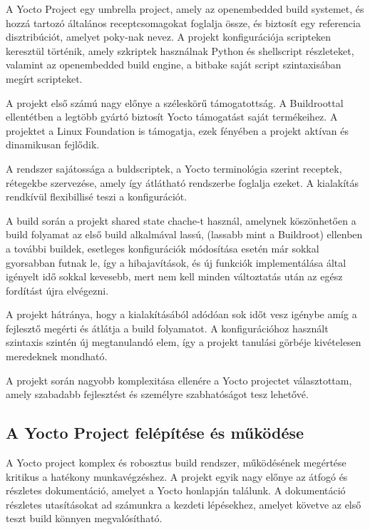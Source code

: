 A Yocto Project egy umbrella project, amely az openembedded build systemet, és
hozzá tartozó általános receptcsomagokat foglalja össze, és biztosít egy
referencia disztribúciót, amelyet poky-nak nevez. A projekt konfigurációja
scripteken keresztül történik, amely szkriptek használnak Python és shellscript
részleteket, valamint az openembedded build engine, a bitbake saját script
szintaxisában megírt scripteket.

A projekt első számú nagy előnye a széleskörű támogatottság. A Buildroottal
ellentétben a legtöbb gyártó biztosít Yocto támogatást saját termékeihez. A
projektet a Linux Foundation is támogatja, ezek fényében a projekt aktívan és
dinamikusan fejlődik. 

A rendszer sajátossága a buldscriptek, a Yocto terminológia szerint receptek,
rétegekbe szervezése, amely így átlátható rendszerbe foglalja ezeket. A
kialakítás rendkívül flexibillisé teszi a konfigurációt.

A build során a projekt shared state chache-t használ, amelynek köszönhetően a
build folyamat az első build alkalmával lassú, (lassabb mint a Buildroot)
ellenben a további buildek, esetleges konfigurációk módosítása esetén már sokkal
gyorsabban futnak le, így a hibajavítások, és új funkciók implementálása által
igényelt idő sokkal kevesebb, mert nem kell minden változtatás után az egész
fordítást újra elvégezni.  

A projekt hátránya, hogy a kialakításából adódóan sok időt vesz igénybe amíg a
fejlesztő megérti és átlátja a build folyamatot. A konfigurációhoz használt
szintaxis szintén új megtanulandó elem, így a projekt tanulási görbéje
kivételesen meredeknek mondható.

\medskip

A projekt során nagyobb komplexitása ellenére a Yocto projectet választottam,
amely szabadabb fejlesztést és személyre szabhatóságot tesz lehetővé.

\subsection{A Yocto Project felépítése és működése}

A Yocto project komplex és robosztus build rendszer, működésének megértése
kritikus a hatékony munkavégzéshez. A projekt egyik nagy előnye az átfogó és
részletes dokumentáció, amelyet a Yocto honlapján\cite{yoctoproject_home}
találunk. A dokumentáció részletes utasításokat ad számunkra a kezdeti
lépésekhez, amelyet követve az első teszt build könnyen megvalósítható.

